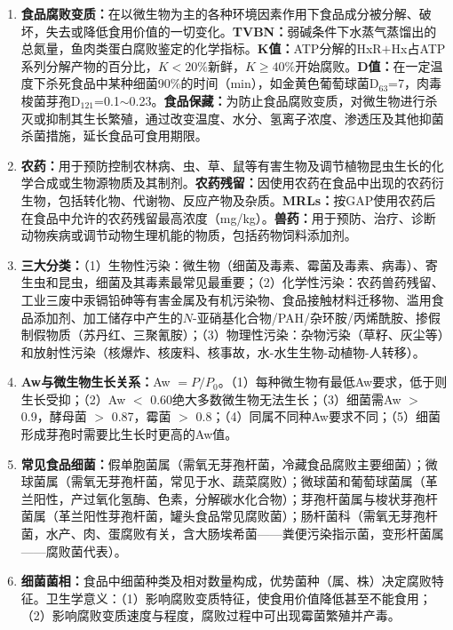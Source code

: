 {\begin{enumerate}[leftmargin=*, itemsep=6pt]
    \item \textbf{食品腐败变质：}在以微生物为主的各种环境因素作用下食品成分被分解、破坏，失去或降低食用价值的一切变化。\textbf{TVBN：}弱碱条件下水蒸气蒸馏出的总氮量，鱼肉类蛋白腐败鉴定的化学指标。\textbf{K值：}ATP分解的HxR$+$Hx占ATP系列分解产物的百分比，$K<20\%$新鲜，$K\geq40\%$开始腐败。\textbf{D值：}在一定温度下杀死食品中某种细菌90\%的时间（min），如金黄色葡萄球菌D$_{63}$=7，肉毒梭菌芽孢D$_{121}$=0.1$\sim$0.23。\textbf{食品保藏：}为防止食品腐败变质，对微生物进行杀灭或抑制其生长繁殖，通过改变温度、水分、氢离子浓度、渗透压及其他抑菌杀菌措施，延长食品可食用期限。

    \item \textbf{农药：}用于预防控制农林病、虫、草、鼠等有害生物及调节植物昆虫生长的化学合成或生物源物质及其制剂。\textbf{农药残留：}因使用农药在食品中出现的农药衍生物，包括转化物、代谢物、反应产物及杂质。\textbf{MRLs：}按GAP使用农药后在食品中允许的农药残留最高浓度（mg/kg）。\textbf{兽药：}用于预防、治疗、诊断动物疾病或调节动物生理机能的物质，包括药物饲料添加剂。

    \item \textbf{三大分类：}（1）生物性污染：微生物（细菌及毒素、霉菌及毒素、病毒）、寄生虫和昆虫，细菌及其毒素最常见最重要；（2）化学性污染：农药兽药残留、工业三废中汞镉铅砷等有害金属及有机污染物、食品接触材料迁移物、滥用食品添加剂、加工储存中产生的$N$-亚硝基化合物/PAH/杂环胺/丙烯酰胺、掺假制假物质（苏丹红、三聚氰胺）；（3）物理性污染：杂物污染（草籽、灰尘等）和放射性污染（核爆炸、核废料、核事故，水-水生生物-动植物-人转移）。

    \item \textbf{Aw与微生物生长关系：}Aw $= P/P_0$。（1）每种微生物有最低Aw要求，低于则生长受抑；（2）Aw $<$ 0.60绝大多数微生物无法生长；（3）细菌需Aw $>$ 0.9，酵母菌 $>$ 0.87，霉菌 $>$ 0.8；（4）同属不同种Aw要求不同；（5）细菌形成芽孢时需要比生长时更高的Aw值。

    \item \textbf{常见食品细菌：}假单胞菌属（需氧无芽孢杆菌，冷藏食品腐败主要细菌）；微球菌属（需氧无芽孢杆菌，常见于水、蔬菜腐败）；微球菌和葡萄球菌属（革兰阳性，产过氧化氢酶、色素，分解碳水化合物）；芽孢杆菌属与梭状芽孢杆菌属（革兰阳性芽孢杆菌，罐头食品常见腐败菌）；肠杆菌科（需氧无芽孢杆菌，水产、肉、蛋腐败有关，含大肠埃希菌——粪便污染指示菌，变形杆菌属——腐败菌代表）。

    \item \textbf{细菌菌相：}食品中细菌种类及相对数量构成，优势菌种（属、株）决定腐败特征。卫生学意义：（1）影响腐败变质特征，使食用价值降低甚至不能食用；（2）影响腐败变质速度与程度，腐败过程中可出现霉菌繁殖并产毒。


\end{enumerate}}
